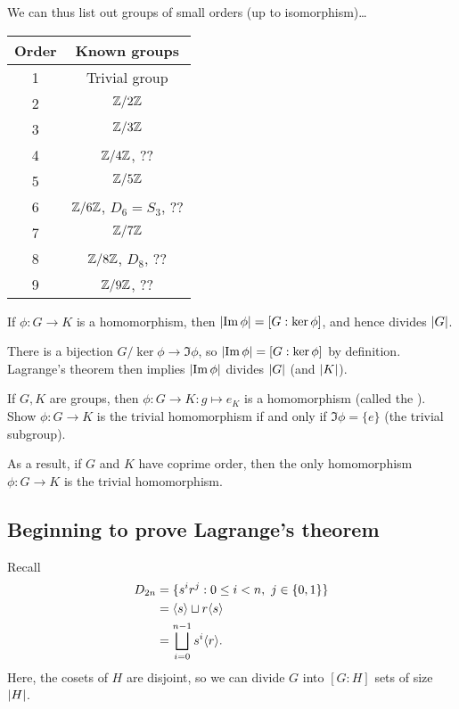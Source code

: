 \documentclass[12pt,letterpaper]{report}
\begin{document}
We can thus list out groups of small orders (up to isomorphism)\dots

\begin{center}
  \renewcommand{\arraystretch}{1.2}
  \begin{tabular}{c | c}
    Order & Known groups \\
    \hline
    1 & Trivial group \\
    2 & $\mathbb{Z}/{2}\mathbb{Z}$ \\
    3 & $\mathbb{Z}/{3}\mathbb{Z}$ \\
    4 & $\mathbb{Z}/{4}\mathbb{Z}$, ?? \\
    5 & $\mathbb{Z}/{5}\mathbb{Z}$ \\
    6 & $\mathbb{Z}/{6}\mathbb{Z}$, $D_6 = S_3$, ?? \\
    7 & $\mathbb{Z}/{7}\mathbb{Z}$ \\
    8 & $\mathbb{Z}/{8}\mathbb{Z}$, $D_8$, ?? \\
    9 & $\mathbb{Z}/{9}\mathbb{Z}$, ??
  \end{tabular}
\end{center}

\begin{cor}{}{}
  If $\phi \colon G \to K$ is a homomorphism, then $\lvert\operatorname{Im} \phi\rvert = [G : \ker\phi]$, and hence
  divides $\lvert G\rvert$.
\end{cor}

\begin{thmproof}
  There is a bijection $G / \ker\phi \to \Im\phi$, so $\lvert\operatorname{Im}\phi\rvert = [G : \ker\phi]$ by
  definition.
  Lagrange's theorem then implies $\lvert\operatorname{Im}\phi\rvert$ divides $\lvert G\rvert$ (and $\lvert K\rvert$).
\end{thmproof}

\begin{exer}{}{}
  If $G, K$ are groups, then $\phi \colon G \to K : g \mapsto e_K$ is a homomorphism (called the
  ).
  Show $\phi \colon G \to K$ is the trivial homomorphism if and only if $\Im\phi = \{e\}$ (the
  trivial subgroup).
\end{exer}

As a result, if $G$ and $K$ have coprime order, then the only homomorphism $\phi \colon G \to K$ is
the trivial homomorphism.

\pagebreak
\subsection{Beginning to prove Lagrange's theorem}

Recall
\begin{align*}
  D_{2n} &= \{s^i r^j : 0 \leq i < n, \ j \in \{0, 1\}\} \\
  &= \langle s\rangle \sqcup r\langle s\rangle \\
  &= \bigsqcup_{i = 0}^{n - 1} s^i \langle r\rangle.
\end{align*}
Here, the cosets of $H$ are disjoint, so we can divide $G$ into $[G : H]$ sets of size $\lvert H\rvert$.
\end{document}

